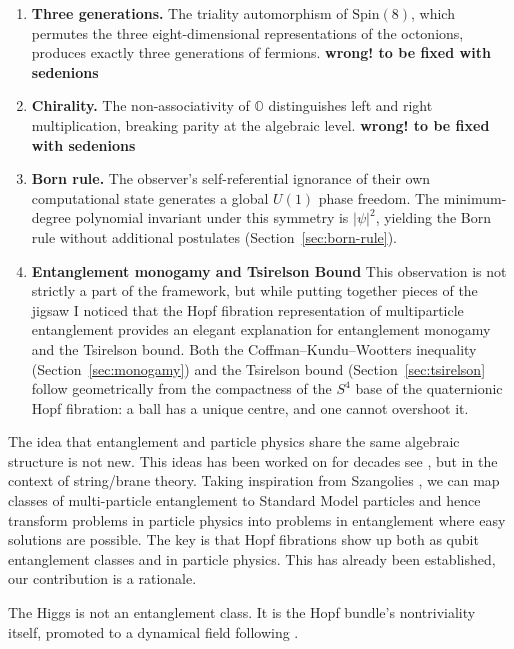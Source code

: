 \documentclass{article}
\theoremstyle{plain}
\theoremstyle{definition}
\theoremstyle{remark}\newtheorem*{remark}{Remark}
\begin{document}
\begin{enumerate}
  \item \textbf{Three generations.} The triality automorphism of $\mathrm{Spin}(8)$, which permutes the three eight-dimensional representations of the octonions, produces exactly three generations of fermions. \textbf{wrong! to be fixed with sedenions}

  \item \textbf{Chirality.} The non-associativity of $\mathbb{O}$ distinguishes left and right multiplication, breaking parity at the algebraic level.
  \textbf{wrong! to be fixed with sedenions}

  \item \textbf{Born rule.} The observer's self-referential ignorance of their own computational state generates a global $U(1)$ phase freedom. The minimum-degree polynomial invariant under this symmetry is $|\psi|^2$, yielding the Born rule without additional postulates (Section~\ref{sec:born-rule}).

  \item \textbf{Entanglement monogamy and Tsirelson Bound} 
  This observation is not strictly a part of the framework, but while putting together pieces of the jigsaw I noticed that the Hopf fibration representation of multiparticle entanglement provides an elegant explanation for entanglement monogamy and the Tsirelson bound. 
  Both the Coffman--Kundu--Wootters inequality (Section~\ref{sec:monogamy}) and the Tsirelson bound (Section~\ref{sec:tsirelson}  follow geometrically from the compactness of the $S^4$ base of the quaternionic Hopf fibration: a ball has a unique centre, and one cannot overshoot it. 
\end{enumerate}

The idea that entanglement and particle physics share the same algebraic structure is not new. This ideas has been worked on for decades see \autocite{borsten2009blackholes}, but in the context of string/brane theory. Taking inspiration from Szangolies \autocite{szangolies2025standardmodel}, we can map classes of multi-particle entanglement to Standard Model particles and hence transform problems in particle physics into problems in entanglement where easy solutions are possible. The key is that Hopf fibrations show up both as qubit entanglement classes and in particle physics. This has already been established, our contribution is a rationale. 

The Higgs is not an entanglement class. It is the Hopf bundle's nontriviality itself, promoted to a dynamical field following \autocite{szangolies2025standardmodel, finkelstein_1962, finkelstein_1963}.
\end{document}
